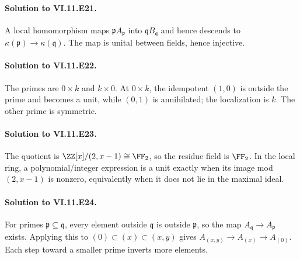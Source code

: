 \paragraph{Solution to VI.11.E21.}
A local homomorphism maps $\mathfrak pA_{\mathfrak p}$ into $\mathfrak qB_{\mathfrak q}$ and hence descends to $\kappa(\mathfrak p)\to\kappa(\mathfrak q)$.  The map is unital between fields, hence injective.

\paragraph{Solution to VI.11.E22.}
The primes are $0\times k$ and $k\times0$.  At $0\times k$, the idempotent $(1,0)$ is outside the prime and becomes a unit, while $(0,1)$ is annihilated; the localization is $k$.  The other prime is symmetric.

\paragraph{Solution to VI.11.E23.}
The quotient is $\ZZ[x]/(2,x-1)\cong\FF_2$, so the residue field is $\FF_2$.  In the local ring, a polynomial/integer expression is a unit exactly when its image mod $(2,x-1)$ is nonzero, equivalently when it does not lie in the maximal ideal.

\paragraph{Solution to VI.11.E24.}
For primes $\mathfrak p\subseteq\mathfrak q$, every element outside $\mathfrak q$ is outside $\mathfrak p$, so the map $A_{\mathfrak q}\to A_{\mathfrak p}$ exists.  Applying this to $(0)\subset(x)\subset(x,y)$ gives $A_{(x,y)}\to A_{(x)}\to A_{(0)}$.  Each step toward a smaller prime inverts more elements.
